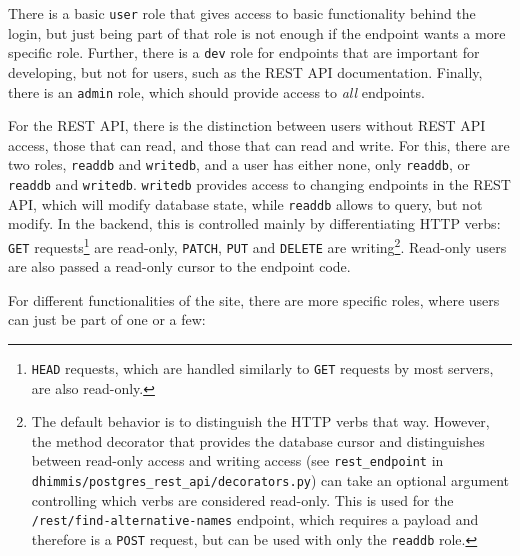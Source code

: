 There is a basic \verb!user! role that gives access to basic functionality behind the login, but just being part of that role is not enough if the endpoint wants a more specific role.
Further, there is a \verb!dev! role for endpoints that are important for developing, but not for users, such as the REST API documentation.
Finally, there is an \verb!admin! role, which should provide access to \emph{all} endpoints.

For the REST API, there is the distinction between users without REST API access, those that can read, and those that can read and write.
For this, there are two roles, \verb!readdb! and \verb!writedb!, and a user has either none, only \verb!readdb!, or \verb!readdb! and \verb!writedb!.
\verb!writedb! provides access to changing endpoints in the REST API, which will modify database state, while \verb!readdb!  allows to query, but not modify.
In the backend, this is controlled mainly by differentiating HTTP verbs: \verb!GET! requests\footnote{%
  \texttt{HEAD} requests, which are handled similarly to \texttt{GET} requests by most servers, are also read-only.
} are read-only, \verb!PATCH!, \verb!PUT! and \verb!DELETE! are writing\footnote{%
  The default behavior is to distinguish the HTTP verbs that way.
  However, the method decorator that provides the database cursor and distinguishes between read-only access and writing access (see \texttt{rest\_endpoint} in \texttt{dhimmis/postgres\_rest\_api/decorators.py}) can take an optional argument controlling which verbs are considered read-only.
  This is used for the \texttt{/rest/find-alternative-names} endpoint, which requires a payload and therefore is a \texttt{POST} request, but can be used with only the \texttt{readdb} role.
}.
Read-only users are also passed a read-only cursor to the endpoint code.

For different functionalities of the site, there are more specific roles, where users can just be part of one or a few:

